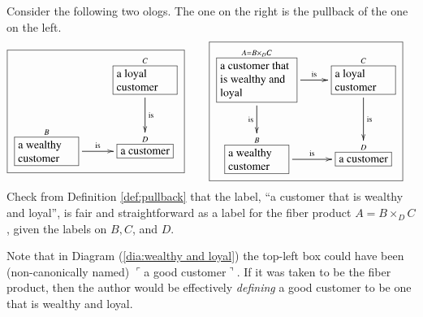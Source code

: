 \documentclass[a4paper]{book}
\def\tn{\textnormal}
\def\hsp{\hspace{.3in}}
\def\rr{\raggedright}
\newcommand{\LA}[2]{\ar[#1]^-{\tn {#2}}}
\newcommand{\LAL}[2]{\ar[#1]_-{\tn {#2}}}
\newcommand{\obox}[3]{\stackrel{#1}{\fbox{\parbox{#2}{#3}}}}
\newcommand{\smbox}[2]{\stackrel{#1}{\fbox{#2}}}
\newcommand{\fakebox}[1]{\tn{$\ulcorner$#1$\urcorner$}}
\theoremstyle{myth}
\newtheorem{remarkENG}[envENG]{\begin{english}Remark\end{english}}
\newtheorem{exampleENG}[envENG]{\begin{english}Example\end{english}}
\newtheorem{remarkRUS}[envRUS]{\begin{russian}Примечание\end{russian}}
\newtheorem{exampleRUS}[envRUS]{\begin{russian}Пример\end{russian}}
\begin{document}
\begin{english}
\begin{russian} \end{russian}

\begin{exampleENG}
Consider the following two ologs. The one on the right is the pullback of the one on the left. 
\begin{align}\label{dia:wealthy and loyal}
\fbox{\xymatrixnocompile{&\obox{C}{.7in}{\rr a loyal customer}\LA{d}{is}\\\obox{B}{.7in}{\rr a wealthy customer}\LA{r}{is}&\smbox{D}{a customer}}}\hsp&\fbox{\xymatrix{\obox{A=B\times_DC}{.9in}{\rr a customer that is wealthy and loyal}\LAL{d}{is}\LA{r}{is}&\obox{C}{.7in}{\rr a loyal customer}\LA{d}{is}\\\obox{B}{.7in}{\rr a wealthy customer}\LA{r}{is}&\smbox{D}{a customer}}}
\end{align}
Check from Definition \ref{def:pullback} that the label, “a customer that is wealthy and loyal”, is fair and straightforward as a label for the fiber product $A=B\times_DC$, given the labels on $B,C$, and $D$.
\end{exampleENG}

\begin{exampleRUS}
\begin{russian} \end{russian}
\end{exampleRUS}

\begin{remarkENG}\label{rem:defining using pullbacks}
Note that in Diagram (\ref{dia:wealthy and loyal}) the top-left box could have been (non-canonically named) \fakebox{a good customer}. If it was taken to be the fiber product, then the author would be effectively {\em defining} a good customer to be one that is wealthy and loyal. 
\end{remarkENG}

\begin{remarkRUS}\label{rem:defining using pullbacks}
\begin{russian} \end{russian}
\end{remarkRUS}


\end{english}
\end{document}
